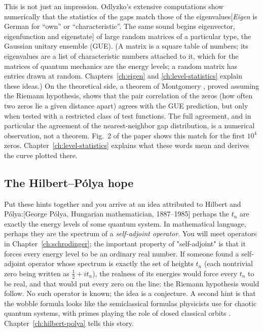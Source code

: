 This is not just an impression. Odlyzko's extensive computations \cite{odlyzko87} show numerically that the statistics of the gaps match those of the eigenvalues[\emph{Eigen} is German for ``own'' or ``characteristic''. The same sound begins eigenvector, eigenfunction and eigenstate] of large random matrices of a particular type, the Gaussian unitary ensemble (GUE). (A matrix is a square table of numbers; its eigenvalues are a list of characteristic numbers attached to it, which for the matrices of quantum mechanics are the energy levels; a random matrix has entries drawn at random. Chapters~\ref{ch:eigen} and \ref{ch:level-statistics} explain these ideas.) On the theoretical side, a theorem of Montgomery \cite{montgomery}, proved assuming the Riemann hypothesis, shows that the pair correlation of the zeros (how often two zeros lie a given distance apart) agrees with the GUE prediction, but only when tested with a restricted class of test functions. The full agreement, and in particular the agreement of the nearest-neighbor gap distribution, is a numerical observation, not a theorem. Fig.~2 of the paper shows this match for the first $10^4$ zeros. Chapter~\ref{ch:level-statistics} explains what these words mean and derives the curve plotted there.

\subsection{The Hilbert--P\'olya hope}

Put these hints together and you arrive at an idea attributed to Hilbert and P\'olya:[George P\'olya, Hungarian mathematician, 1887--1985] perhaps the $t_n$ are exactly the energy levels of some quantum system. In mathematical language, perhaps they are the spectrum of a \emph{self-adjoint operator}. You will meet operators in Chapter~\ref{ch:schrodinger}; the important property of "self-adjoint" is that it forces every energy level to be an ordinary real number. If someone found a self-adjoint operator whose spectrum is exactly the set of heights $t_n$ (each nontrivial zero being written as $\tfrac12 + i t_n$), the realness of its energies would force every $t_n$ to be real, and that would put every zero on the line: the Riemann hypothesis would follow. No such operator is known; the idea is a conjecture. A second hint is that the wobble formula looks like the semiclassical formulas physicists use for chaotic quantum systems, with primes playing the role of closed classical orbits \cite{berrykeating99,schumayer}. Chapter~\ref{ch:hilbert-polya} tells this story.

